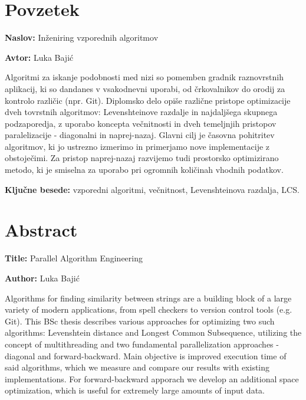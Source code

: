 \documentclass[a4paper,12pt,openright]{book}
\newcommand{\ttitle}{Inženiring vzporednih algoritmov}
\newcommand{\ttitleEn}{Parallel Algorithm Engineering}
\newcommand{\tauthor}{Luka Bajić}
\newcommand{\tkeywords}{vzporedni algoritmi, večnitnost, Levenshteinova razdalja, LCS}
\newcommand{\clearemptydoublepage}{\newpage{\pagestyle{empty}\cleardoublepage}}
\begin{document}
\clearemptydoublepage

{}
\chapter*{Povzetek}

\noindent\textbf{Naslov:} \ttitle
\bigskip

\noindent\textbf{Avtor:} \tauthor
\bigskip

\noindent Algoritmi za iskanje podobnosti med nizi so pomemben gradnik raznovrstnih aplikacij, ki so dandanes v vsakodnevni uporabi, od črkovalnikov do orodij za kontrolo različic (npr. Git). Diplomsko delo opiše različne pristope optimizacije dveh tovrstnih algoritmov: Levenshteinove razdalje in najdaljšega skupnega podzaporedja, z uporabo koncepta večnitnosti in dveh temeljnjih pristopov paralelizacije - diagonalni in naprej-nazaj. Glavni cilj je časovna pohitritev algoritmov, ki jo ustrezno izmerimo in primerjamo nove implementacije z obstoječimi. Za pristop naprej-nazaj razvijemo tudi prostorsko optimizirano metodo, ki je smiselna za uporabo pri ogromnih količinah vhodnih podatkov. 

\bigskip

\noindent\textbf{Ključne besede:} \tkeywords.
\clearemptydoublepage

{}
\chapter*{Abstract}

\noindent\textbf{Title:} \ttitleEn
\bigskip

\noindent\textbf{Author:} \tauthor
\bigskip

\noindent Algorithms for finding similarity between strings are a building block of a large variety of modern applications, from spell checkers to version control tools (e.g. Git). This BSc thesis describes various approaches for optimizing two such algorithms: Levenshtein distance and Longest Common Subsequence, utilizing the concept of multithreading and two fundamental parallelization approaches - diagonal and forward-backward. Main objective is improved execution time of said algorithms, which we measure and compare our results with existing implementations. For forward-backward apporach we develop an additional space optimization, which is useful for extremely large amounts of input data.
\end{document}
